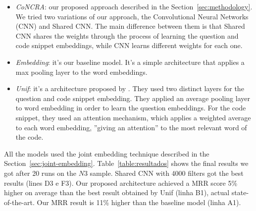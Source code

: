 \documentclass[sigconf]{acmart}
\begin{document}
\begin{itemize}
    \item \emph{CoNCRA}: our proposed approach described in the Section~\ref{sec:methodology}. We tried two variations of our approach, the Convolutional Neural Networks (CNN) and Shared CNN. The main difference between them is that Shared CNN shares the weights through the process of learning the question and code snippet embeddings, while CNN learns different weights for each one.
    \item \emph{Embedding}: it's our baseline model. It's a simple architecture that applies a max pooling layer to the word embeddings. 
    \item \emph{Unif}: it's a architecture proposed by \cite{cambronero-deep-code-search-2019}. They used two distinct layers for the question and code snippet embedding. They applied an average pooling layer to word embedding in order to learn the question embeddings. For the code snippet, they used an attention mechanism, which applies a weighted average to each word embedding, ''giving an attention'' to the most relevant word of the code.
\end{itemize}

All the models used the joint embedding technique described in the Section~\ref{sec:joint-embedding}. Table~\ref{table:resultados} shows the final results we got after 20 runs on the $N3$ sample. Shared CNN with 4000 filters got the best results (lines D3 e F3). Our proposed architecture achieved a MRR score 5\% higher on average than the best result obtained by Unif (linha B1), actual state-of-the-art. Our MRR result is 11\% higher than the baseline model (linha A1). 
\end{document}
